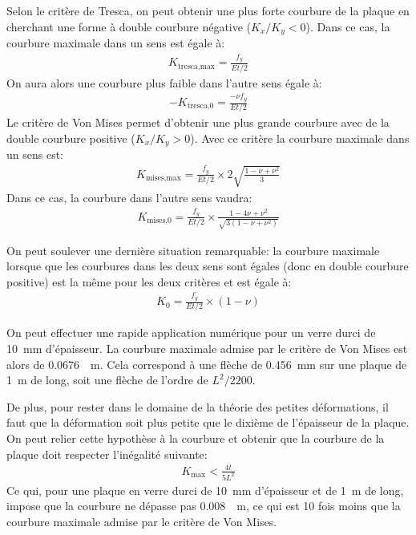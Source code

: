 \documentclass[11pt,titlepage]{article}
\begin{document}
Selon le critère de Tresca, on peut obtenir une plus forte courbure de la plaque en cherchant une forme à double courbure négative ($K_x/K_y < 0$). Dans ce cas, la courbure maximale dans un sens est égale à:
\begin{align}
K_{\text{tresca,max}} = \frac{f_y}{Et/2}
\end{align}
On aura alors une courbure plus faible dans l'autre sens égale à:
\begin{align}
    -K_{\text{tresca,0}} = \frac{-\nu f_y}{Et/2}
\end{align}
Le critère de Von Mises permet d'obtenir une plus grande courbure avec de la double courbure positive ($K_x/K_y > 0$). Avec ce critère la courbure maximale dans un sens est:
\begin{align}
K_{\text{mises,max}} = \frac{f_y}{Et/2}\times 2\sqrt{\frac{1-\nu+\nu^2}{3}}
\end{align}
Dans ce cas, la courbure dans l'autre sens vaudra:
\begin{align}
    K_{\text{mises,0}} = \frac{f_y}{Et/2}\times \frac{1-4\nu+\nu^2}{\sqrt{3(1-\nu+\nu^2)}}
\end{align}

On peut soulever une dernière situation remarquable: la courbure maximale lorsque que les courbures dans les deux sens sont égales (donc en double courbure positive) est la même pour les deux critères et est égale à:
\begin{align}
    K_0 = \frac{f_y}{Et/2}\times (1-\nu)
\end{align}

On peut effectuer une rapide application numérique pour un verre durci de \qty{10}{\milli\metre} d'épaisseur. La courbure maximale admise par le critère de Von Mises est alors de \qty{0.0676}{\per\metre}. Cela correspond à une flèche de \qty{0.456}{\milli\metre} sur une plaque de \qty{1}{\metre} de long, soit une flèche de l'ordre de $L^2/2200$. 

De plus, pour rester dans le domaine de la théorie des petites déformations, il faut que la déformation soit plus petite que le dixième de l'épaisseur de la plaque. On peut relier cette hypothèse à la courbure et obtenir que la courbure de la plaque doit respecter l'inégalité suivante:
\begin{align}
K_{\text{max}} < \frac{4t}{5L^2}
\end{align}
Ce qui, pour une plaque en verre durci de \qty{10}{\milli\metre} d'épaisseur et de \qty{1}{\metre} de long, impose que la courbure ne dépasse pas \qty{0.008}{\per\metre}, ce qui est 10 fois moins que la courbure maximale admise par le critère de Von Mises. 
\end{document}
